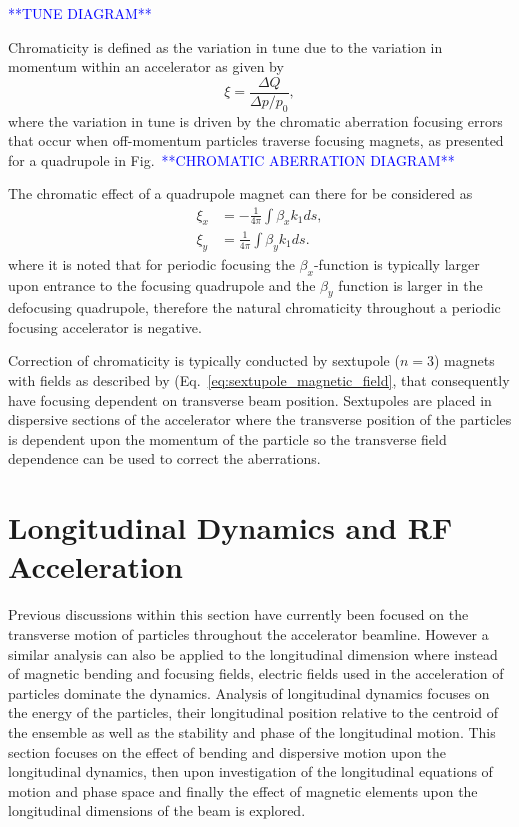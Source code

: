 \documentclass[../main.tex]{subfiles}
\begin{document}
\textcolor{blue}{**TUNE DIAGRAM**}

Chromaticity is defined as the variation in tune due to the variation in momentum within an accelerator as given by
\begin{equation}
\xi = \frac{\Delta Q}{\Delta p/p_{0}},
\label{eq:accelerator_chromaticity}    
\end{equation}
where the variation in tune is driven by the chromatic aberration focusing errors that occur when off-momentum particles traverse focusing magnets, as presented for a quadrupole in Fig.~\textcolor{blue}{**CHROMATIC ABERRATION DIAGRAM**}

The chromatic effect of a quadrupole magnet can there for be considered as
\begin{align}
\xi_{x} &= -\frac{1}{4\pi}\int\beta_{x}k_{1}ds, \\
\xi_{y} &= \frac{1}{4\pi}\int\beta_{y}k_{1}ds.
\label{eq:quadrupole_chromaticity}
\end{align}
where it is noted that for periodic focusing the $\beta_{x}$-function is typically larger upon entrance to the focusing quadrupole and the $\beta_{y}$ function is larger in the defocusing quadrupole, therefore the natural chromaticity throughout a periodic focusing accelerator is negative. 

Correction of chromaticity is typically conducted by sextupole ($n=3$) magnets with fields as described by (Eq.~\ref{eq:sextupole_magnetic_field}, that consequently have focusing dependent on transverse beam position. Sextupoles are placed in dispersive sections of the accelerator where the transverse position of the particles is dependent upon the momentum of the particle so the transverse field dependence can be used to correct the aberrations. 

\section{Longitudinal Dynamics and RF Acceleration}

Previous discussions within this section have currently been focused on the transverse motion of particles throughout the accelerator beamline. However a similar analysis can also be applied to the longitudinal dimension where instead of magnetic bending and focusing fields, electric fields used in the acceleration of particles dominate the dynamics. Analysis of longitudinal dynamics focuses on the energy of the particles, their longitudinal position relative to the centroid of the ensemble as well as the stability and phase of the longitudinal motion. This section focuses on the effect of bending and dispersive motion upon the longitudinal dynamics, then upon investigation of the longitudinal equations of motion and phase space and finally the effect of magnetic elements upon the longitudinal dimensions of the beam is explored.
\end{document}
